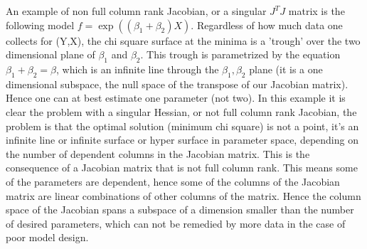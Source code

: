 An example of non full column rank Jacobian, or a singular $J^TJ$ matrix is the following model $f = \exp{((\beta_1 + \beta_2 )X)}$\cite{beck}.  Regardless of how much data one collects for (Y,X), the chi square surface at the minima is a 'trough' over the two dimensional plane of $\beta_1$ and $\beta_2$.  This trough is parametrized by the equation  $\beta_1+ \beta_2=\beta$, which is an infinite line through the $\beta_1,\beta_2$ plane (it is a one dimensional subspace, the null space of the transpose of our Jacobian matrix).  Hence one can at best estimate one parameter (not two).  In this example it is clear the problem with a singular Hessian, or not full column rank Jacobian, the problem is that the optimal solution (minimum chi square) is not a point, it's an infinite line or infinite surface or hyper surface in parameter space, depending on the number of dependent columns in the Jacobian matrix.  This is the consequence of a Jacobian matrix that is not full column rank.  This means some of the parameters are dependent, hence some of the columns of the Jacobian matrix are linear combinations of other columns of the matrix.  Hence the column space of the Jacobian spans a subspace of a dimension smaller than the number of desired parameters, which can not be remedied by more data in the case of poor model design.


